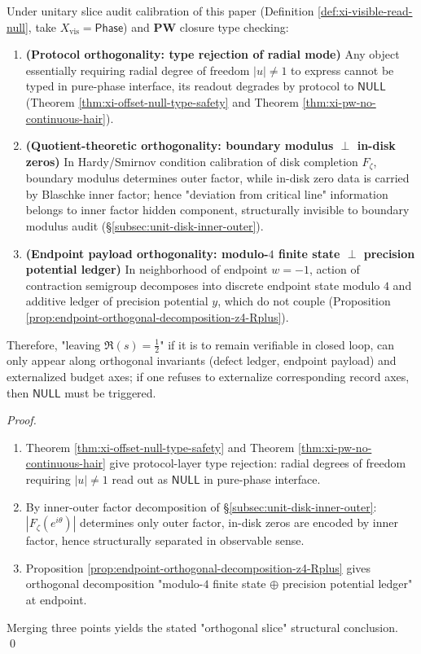 \begin{theorem}\label{thm:xi-orthogonal-slice-structure}
Under unitary slice audit calibration of this paper (Definition \ref{def:xi-visible-read-null}, take \(X_{\mathrm{vis}}=\mathsf{Phase}\)) and \(\mathbf{PW}\) closure type checking:
\begin{enumerate}
  \item \textbf{(Protocol orthogonality: type rejection of radial mode)}
  Any object essentially requiring radial degree of freedom \(|u|\neq 1\) to express cannot be typed in pure-phase interface, its readout degrades by protocol to \(\mathsf{NULL}\) (Theorem \ref{thm:xi-offset-null-type-safety} and Theorem \ref{thm:xi-pw-no-continuous-hair}).
  \item \textbf{(Quotient-theoretic orthogonality: boundary modulus \(\perp\) in-disk zeros)}
  In Hardy/Smirnov condition calibration of disk completion \(F_\zeta\), boundary modulus determines outer factor, while in-disk zero data is carried by Blaschke inner factor;
  hence "deviation from critical line" information belongs to inner factor hidden component, structurally invisible to boundary modulus audit (\S\ref{subsec:unit-disk-inner-outer}).
  \item \textbf{(Endpoint payload orthogonality: modulo-\(4\) finite state \(\perp\) precision potential ledger)}
  In neighborhood of endpoint \(w=-1\), action of contraction semigroup decomposes into discrete endpoint state modulo \(4\) and additive ledger of precision potential \(y\), which do not couple (Proposition \ref{prop:endpoint-orthogonal-decomposition-z4-Rplus}).
\end{enumerate}
Therefore, "leaving \(\Re(s)=\tfrac12\)" if it is to remain verifiable in closed loop, can only appear along orthogonal invariants (defect ledger, endpoint payload) and externalized budget axes; if one refuses to externalize corresponding record axes, then \(\mathsf{NULL}\) must be triggered.
\end{theorem}
\begin{proof}
\begin{enumerate}
  \item
  Theorem \ref{thm:xi-offset-null-type-safety} and Theorem \ref{thm:xi-pw-no-continuous-hair} give protocol-layer type rejection: radial degrees of freedom requiring \(|u|\neq 1\) read out as \(\mathsf{NULL}\) in pure-phase interface.
  \item
  By inner-outer factor decomposition of \S\ref{subsec:unit-disk-inner-outer}: \(|F_\zeta(e^{i\theta})|\) determines only outer factor, in-disk zeros are encoded by inner factor, hence structurally separated in observable sense.
  \item
  Proposition \ref{prop:endpoint-orthogonal-decomposition-z4-Rplus} gives orthogonal decomposition "modulo-\(4\) finite state \(\oplus\) precision potential ledger" at endpoint.
\end{enumerate}
Merging three points yields the stated "orthogonal slice" structural conclusion. \qed
\end{proof}


